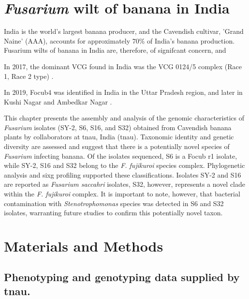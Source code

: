 
\section{\textit{Fusarium} wilt of banana in India} 

India is the world's largest banana producer, and the Cavendish cultivar, 'Grand Naine' (AAA), accounts for approximately 70\% of India's banana production. Fusarium wilts of banana in India are, therefore, of signifcant concern, and  


In 2017,  the dominant VCG found in India was the VCG 0124/5 complex (Race 1, Race 2 type)  \cite{Mostert2017} . 

In 2019, \ac{Focub4} was identified in India in the Uttar Pradesh region, and later in Kushi Nagar and Ambedkar Nagar \cite{Damodaran2019}.  



This chapter presents the assembly and analysis of the genomic characteristics of \textit{Fusarium} isolates (SY-2, S6, S16, and S32) obtained from Cavendish banana plants by collaborators at \acl{tnau}, India (\acs{tnau}). Taxonomic identity and genetic diversity are assessed and suggest that there is a potentially novel species of \textit{Fusarium} infecting banana. Of the isolates sequenced, S6 is a \ac{Focub} \ac{r1} isolate, while SY-2, S16 and S32 belong to the \textit{F. fujikuroi} species complex. Phylogenetic analysis and \ac{sixg} profiling supported these classifications. Isolates SY-2 and S16 are reported as \textit{Fusarium saccahri} isolates, S32, however, represents a novel clade within the \textit{F. fujikuroi} complex. It is important to note, however, that bacterial contamination with \textit{Stenotrophomonas} species was detected in S6 and S32 isolates, warranting future studies to confirm this potentially novel taxon.


\section{Materials and Methods}
\subsection{Phenotyping and genotyping data supplied by \acl{tnau}.}

